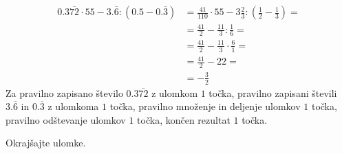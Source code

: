 \documentclass[addpoints]{exam}
\begin{document}
\begin{questions}
\begin{parts}
        \begin{solution}[4cm]
            \begin{align*}
                0.3\overline{72}\cdot 55 - 3.\overline{6}:(0.5-0.\overline{3})&=\frac{41}{110}\cdot 55 - 3\frac{2}{3}:(\frac{1}{2}-\frac{1}{3})= \\
                                                                            &=\frac{41}{2} - \frac{11}{3}:\frac{1}{6}= \\
                                                                            &= \frac{41}{2}-\frac{11}{3}\cdot \frac{6}{1}= \\
                                                                            &= \frac{41}{2}-22= \\
                                                                            &= -\frac{3}{2}
            \end{align*}
            Za pravilno zapisano število $0.3\overline{72}$ z ulomkom $1$ točka, pravilno zapisani števili $3.\overline{6}$ in $0.\overline{3}$ z ulomkoma $1$ točka, pravilno množenje in deljenje ulomkov $1$ točka, pravilno odštevanje ulomkov $1$ točka, končen rezultat $1$ točka.
        \end{solution}

    \end{parts}



    \newpage

    \question
    Okrajšajte ulomke.
\end{questions}
\end{document}
